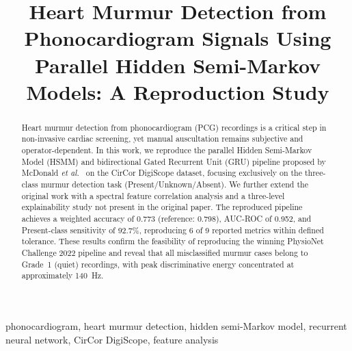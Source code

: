 \documentclass[conference]{IEEEtran}
\begin{document}
\title{Heart Murmur Detection from Phonocardiogram Signals Using\\
Parallel Hidden Semi-Markov Models: A Reproduction Study}

\author{
}

\maketitle

\begin{abstract}
Heart murmur detection from phonocardiogram (PCG) recordings is a critical
step in non-invasive cardiac screening, yet manual auscultation remains
subjective and operator-dependent.
In this work, we reproduce the parallel Hidden Semi-Markov Model (HSMM)
and bidirectional Gated Recurrent Unit (GRU) pipeline proposed by
McDonald \textit{et al.}~\cite{mcdonald2024} on the CirCor DigiScope
dataset, focusing exclusively on the three-class murmur detection task
(Present/Unknown/Absent). We further extend the original work with a
spectral feature correlation analysis and a three-level explainability
study not present in the original paper.
The reproduced pipeline achieves a weighted accuracy of 0.773
(reference: 0.798), AUC-ROC of 0.952, and Present-class sensitivity of
92.7\%, reproducing 6 of 9 reported metrics within defined tolerance.
These results confirm the feasibility of reproducing the winning
PhysioNet Challenge 2022 pipeline and reveal that all misclassified
murmur cases belong to Grade~1 (quiet) recordings, with peak
discriminative energy concentrated at approximately 140~Hz.
\end{abstract}

\begin{IEEEkeywords}
phonocardiogram, heart murmur detection, hidden semi-Markov model,
recurrent neural network, CirCor DigiScope, feature analysis
\end{IEEEkeywords}
\end{document}
